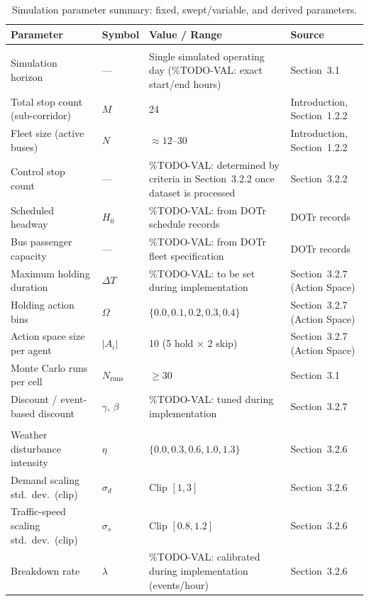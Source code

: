 \begin{table}[htbp]
\centering
\caption{Simulation parameter summary: fixed, swept/variable, and derived parameters.}
\label{tab:sim-parameters}
\small
\renewcommand{\arraystretch}{1.25}

\begin{tabularx}{\textwidth}{
>{\RaggedRight\arraybackslash}p{}
>{\RaggedRight\arraybackslash}p{}
X
>{\RaggedRight\arraybackslash}p{}
}

\toprule
\textbf{Parameter} & \textbf{Symbol} & \textbf{Value / Range} & \textbf{Source} \\
\midrule
\multicolumn{4}{l}{\textit{Fixed simulation parameters}} \\
\midrule

Simulation horizon & --- & Single simulated operating day (\%TODO-VAL: exact start/end hours) & Section~3.1 \\
Total stop count (sub-corridor) & $M$ & 24 & Introduction, Section~1.2.2 \\
Fleet size (active buses) & $N$ & $\approx 12$--$30$ & Introduction, Section~1.2.2 \\
Control stop count & --- & \%TODO-VAL: determined by criteria in Section~3.2.2 once dataset is processed & Section~3.2.2 \\
Scheduled headway & $H_0$ & \%TODO-VAL: from DOTr schedule records & DOTr records \\
Bus passenger capacity & --- & \%TODO-VAL: from DOTr fleet specification & DOTr records \\
Maximum holding duration & $\Delta T$ & \%TODO-VAL: to be set during implementation & Section~3.2.7 (Action Space) \\
Holding action bins & $\Omega$ & $\{0.0, 0.1, 0.2, 0.3, 0.4\}$ & Section~3.2.7 (Action Space) \\
Action space size per agent & $|A_i|$ & 10 (5 hold $\times$ 2 skip) & Section~3.2.7 (Action Space) \\
Monte Carlo runs per cell & $N_{\text{runs}}$ & $\geq 30$ & Section~3.1 \\
Discount / event-based discount & $\gamma$, $\beta$ & \%TODO-VAL: tuned during implementation & Section~3.2.7 \\

\midrule
\multicolumn{4}{l}{\textit{Swept / variable parameters}} \\
\midrule

Weather disturbance intensity & $\eta$ & $\{0.0, 0.3, 0.6, 1.0, 1.3\}$ & Section~3.2.6 \\
Demand scaling std.\ dev.\ (clip) & $\sigma_d$ & Clip $[1, 3]$ & Section~3.2.6 \\
Traffic-speed scaling std.\ dev.\ (clip) & $\sigma_s$ & Clip $[0.8, 1.2]$ & Section~3.2.6 \\
Breakdown rate & $\lambda$ & \%TODO-VAL: calibrated during implementation (events/hour) & Section~3.2.6 \\


\end{tabularx}
\end{table}

